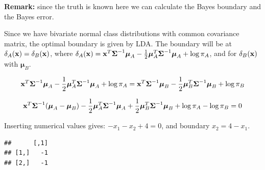 \documentclass[10pt,ignorenonframetext,]{beamer}
\newenvironment{Shaded}{\begin{snugshade}}{\end{snugshade}}
\newcommand{\KeywordTok}[1]{\textcolor[rgb]{0.13,0.29,0.53}{\textbf{#1}}}
\newcommand{\DataTypeTok}[1]{\textcolor[rgb]{0.13,0.29,0.53}{#1}}
\newcommand{\DecValTok}[1]{\textcolor[rgb]{0.00,0.00,0.81}{#1}}
\newcommand{\FloatTok}[1]{\textcolor[rgb]{0.00,0.00,0.81}{#1}}
\newcommand{\StringTok}[1]{\textcolor[rgb]{0.31,0.60,0.02}{#1}}
\newcommand{\OperatorTok}[1]{\textcolor[rgb]{0.81,0.36,0.00}{\textbf{#1}}}
\newcommand{\NormalTok}[1]{#1}
\begin{document}
\begin{frame}[fragile]

\textbf{Remark:} since the truth is known here we can calculate the
Bayes boundary and the Bayes error.

Since we have bivariate normal class distributions with common
covariance matrix, the optimal boundary is given by LDA. The boundary
will be at \(\delta_A({\bf x})=\delta_B({\bf x})\), where
\(\delta_A({\bf x})= {\bf x}^T \boldsymbol{\Sigma}^{-1}\boldsymbol\mu_A - \frac{1}{2}\boldsymbol\mu_A^T \boldsymbol{\Sigma}^{-1}\boldsymbol\mu_A + \log \pi_A\),
and for \(\delta_B({\bf x})\) with \(\boldsymbol\mu_B\).

\[{\bf x}^T \boldsymbol{\Sigma}^{-1}\boldsymbol\mu_A - \frac{1}{2}\boldsymbol\mu_A^T \boldsymbol{\Sigma}^{-1}\boldsymbol\mu_A + \log \pi_A={\bf x}^T \boldsymbol{\Sigma}^{-1}\boldsymbol\mu_B - \frac{1}{2}\boldsymbol\mu_B^T \boldsymbol{\Sigma}^{-1}\boldsymbol\mu_B + \log \pi_B\]

\[{\bf x}^T\boldsymbol{\Sigma}^{-1}(\boldsymbol\mu_A -\boldsymbol\mu_B)-\frac{1}{2}\boldsymbol\mu_A^T \boldsymbol{\Sigma}^{-1}\boldsymbol\mu_A +\frac{1}{2}\boldsymbol\mu_B^T \boldsymbol{\Sigma}^{-1}\boldsymbol\mu_B +\log \pi_A-\log \pi_B=0\]

Inserting numerical values gives: \(-x_1-x_2+4=0\), and boundary
\(x_2=4-x_1\).

\begin{Shaded}
\end{Shaded}

\begin{verbatim}
##      [,1]
## [1,]   -1
## [2,]   -1
\end{verbatim}

\begin{Shaded}
\end{Shaded}


\end{frame}
\end{document}
